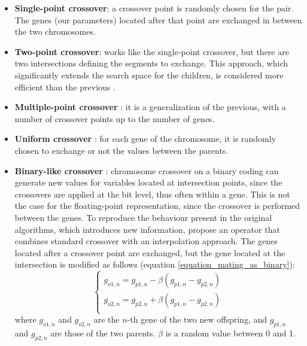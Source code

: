 \documentclass[twocol]{ametsoc}
\begin{document}
\begin{itemize}
	\item \textbf{Single-point crossover}: a crossover point is randomly chosen for the pair. The genes (our parameters) located after that point are exchanged in between the two chromosomes.
	
	\item \textbf{Two-point crossover}: works like the single-point crossover, but there are two intersections defining the segments to exchange. This approach, which significantly extends the search space for the children, is considered more efficient than the previous \citep{Beasley1993a, Haupt2004}.
	
	\item \textbf{Multiple-point crossover} \citep{DeJong1975a}: it is a generalization of the previous, with a number of crossover points up to the number of genes.
	
	\item \textbf{Uniform crossover} \citep{Syswerda1989}: for each gene of the chromosome, it is randomly chosen to exchange or not the values between the parents.
	
	\item \textbf{Binary-like crossover} \citep{Haupt2004}: chromosome crossover on a binary coding can generate new values for variables located at intersection points, since the crossovers are applied at the bit level, thus often within a gene. This is not the case for the floating-point representation, since the crossover is performed between the genes. To reproduce the behaviour present in the original algorithms, which introduces new information, \citet{Haupt2004} propose an operator that combines standard crossover with an interpolation approach. The genes located after a crossover point are exchanged, but the gene located at the intersection is modified as follows (equation \ref{equation_mating_as_binary}):
	\begin{equation}
	\left\lbrace \begin{array}{l} 
	g_{o1,n} = g_{p1,n} - \beta (g_{p1,n} - g_{p2,n}) \\
	g_{o2,n} = g_{p2,n} + \beta (g_{p1,n} - g_{p2,n}) \\
	\end{array} \right.
	\label{equation_mating_as_binary}
	\end{equation}
	where $g_{o1,n}$ and $g_{o2,n}$ are the $n$-th gene of the two new offspring, and $g_{p1,n}$ and $g_{p2,n}$ are those of the two parents. $\beta$ is a random value between 0 and 1.
	

\end{itemize}
\end{document}
